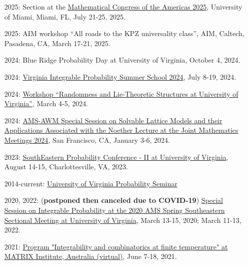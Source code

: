 \documentclass[letterpaper,11pt]{article}
\begin{document}
\begin{itemize}
	\item [2025:] 
	Section at the
	\href{https://www.math.miami.edu/mca/}{Mathematical Congress of the Americas 2025},
	University of Miami,
	Miami, FL,
	July 21-25, 2025.

	\item [2025:] 
	AIM workshop 
	``All roads to the KPZ universality class'', 
	AIM, Caltech, Pasadena, CA, March 17-21, 2025.

	\item [2024:] 
	Blue Ridge Probability Day at University of Virginia,
	October 4, 2024.

	\item [2024:] 
	\href{https://lpetrov.cc/vipss2024/}{Virginia Integrable Probability Summer School 2024},
	July 8-19, 2024.

	\item [2024:] 
	\href{https://math.virginia.edu/random-lie-2024/}{Workshop ``Randomness and Lie-Theoretic Structures at University of Virginia''},
	March 4-5, 2024.

	\item [2024:] 
\href{https://www.jointmathematicsmeetings.org/meetings/national/jmm2024/2300_program_ss43.html}{AMS-AWM Special Session on Solvable Lattice Models and their Applications Associated with the Noether Lecture at the Joint Mathematics Meetings 2024},
San Francisco, CA, January 3-6, 2024.

\item [2023:] 
\href{https://sites.google.com/view/sepc2023ii/sepc-2023-ii}{SouthEastern Probability Conference - II at University of Virginia},
August 14-15, Charlottesville, VA, 2023.

\item [2014-current:] 
\href{http://math.virginia.edu/seminars/probability/}{University of Virginia Probability Seminar}

\item [2020, 2022:]
(\textbf{postponed then canceled due to COVID-19})
\href{http://www.ams.org/meetings/sectional/2273_program.html}{Special Session on Integrable Probability at the 2020 AMS Spring Southeastern Sectional Meeting at University of Virginia},
March 13-15, 2020; March 11-13, 2022.

\item [2021:]
\href{https://www.matrix-inst.org.au/events/integrability-and-combinatorics-at-finite-temperature/}{Program "Integrability and combinatorics at finite temperature" at MATRIX Institute, Australia (virtual)},
June 7-18, 2021.


\end{itemize}
\end{document}

